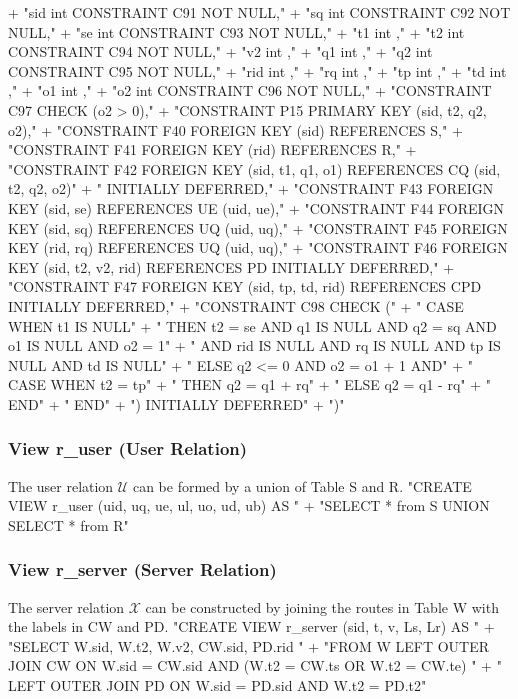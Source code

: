 \documentclass{article}
\def\nwendcode{\endtrivlist \endgroup}      %
\let\nwdocspar=\par
\theoremstyle{definition}                   %
\begin{document}
  + "sid int  CONSTRAINT C91 NOT NULL,"
  + "sq  int  CONSTRAINT C92 NOT NULL,"
  + "se  int  CONSTRAINT C93 NOT NULL,"
  + "t1  int  ,"
  + "t2  int  CONSTRAINT C94 NOT NULL,"
  + "v2  int  ,"
  + "q1  int  ,"
  + "q2  int  CONSTRAINT C95 NOT NULL,"
  + "rid int  ,"
  + "rq  int  ,"
  + "tp  int  ,"
  + "td  int  ,"
  + "o1  int  ,"
  + "o2  int  CONSTRAINT C96 NOT NULL,"
  + "CONSTRAINT C97 CHECK (o2 > 0),"
  + "CONSTRAINT P15 PRIMARY KEY (sid, t2, q2, o2),"
  + "CONSTRAINT F40 FOREIGN KEY (sid) REFERENCES S,"
  + "CONSTRAINT F41 FOREIGN KEY (rid) REFERENCES R,"
  + "CONSTRAINT F42 FOREIGN KEY (sid, t1, q1, o1) REFERENCES CQ (sid, t2, q2, o2)"
  + "  INITIALLY DEFERRED,"
  + "CONSTRAINT F43 FOREIGN KEY (sid, se) REFERENCES UE (uid, ue),"
  + "CONSTRAINT F44 FOREIGN KEY (sid, sq) REFERENCES UQ (uid, uq),"
  + "CONSTRAINT F45 FOREIGN KEY (rid, rq) REFERENCES UQ (uid, uq),"
  + "CONSTRAINT F46 FOREIGN KEY (sid, t2, v2, rid) REFERENCES PD INITIALLY DEFERRED,"
  + "CONSTRAINT F47 FOREIGN KEY (sid, tp, td, rid) REFERENCES CPD INITIALLY DEFERRED,"
  + "CONSTRAINT C98 CHECK ("
  + "  CASE WHEN t1 IS NULL"
  + "    THEN t2 = se AND q1 IS NULL AND q2 = sq AND o1 IS NULL AND o2 = 1"
  + "      AND rid IS NULL AND rq IS NULL AND tp IS NULL AND td IS NULL"
  + "    ELSE q2 <= 0 AND o2 = o1 + 1 AND"
  + "      CASE WHEN t2 = tp"
  + "        THEN q2 = q1 + rq"
  + "        ELSE q2 = q1 - rq"
  + "      END"
  + "  END"
  + ") INITIALLY DEFERRED"
  + ")"
\nwendcode{}\nwdocspar

\subsubsection{View r\_user (User Relation)}
The user relation $\mathcal{U}$ can be formed by a union of Table S and R.
\nwenddocs{}\endmoddef{}
"CREATE VIEW r_user (uid, uq, ue, ul, uo, ud, ub) AS "
  + "SELECT * from S UNION SELECT * from R"
\nwendcode{}\nwdocspar

\subsubsection{View r\_server (Server Relation)}
The server relation $\mathcal{X}$ can be constructed by joining the routes in
Table W with the labels in CW and PD.
\nwenddocs{}\endmoddef{}
"CREATE VIEW r_server (sid, t, v, Ls, Lr) AS "
  + "SELECT W.sid, W.t2, W.v2, CW.sid, PD.rid "
  + "FROM W LEFT OUTER JOIN CW ON W.sid = CW.sid AND (W.t2 = CW.ts OR W.t2 = CW.te) "
  + "  LEFT OUTER JOIN PD ON W.sid = PD.sid AND W.t2 = PD.t2"
\nwendcode{}\nwdocspar
\end{document}
